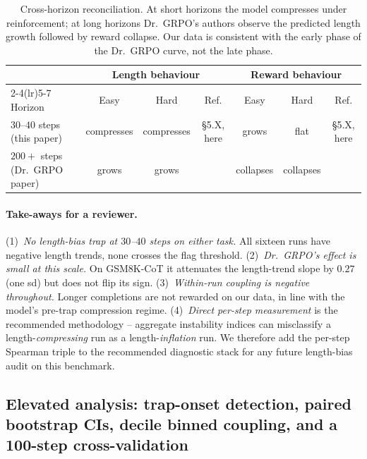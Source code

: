 \begin{table}[htbp]
\centering
\small
\begin{tabular}{lcccccc}
\toprule
& \multicolumn{3}{c}{Length behaviour} & \multicolumn{3}{c}{Reward behaviour} \\
\cmidrule(lr){2-4}\cmidrule(lr){5-7}
Horizon & Easy & Hard & Ref. & Easy & Hard & Ref. \\
\midrule
$30$--$40$ steps (this paper)         & compresses & compresses & §5.X, here & grows    & flat    & §5.X, here \\
$200{+}$ steps (Dr.~GRPO paper)        & grows      & grows      & \cite{tong2025drgrpo} & collapses & collapses & \cite{tong2025drgrpo} \\
\bottomrule
\end{tabular}
\caption{Cross-horizon reconciliation. At short horizons the model compresses under
reinforcement; at long horizons Dr.~GRPO's authors observe the predicted length growth
followed by reward collapse. Our data is consistent with the early phase of the
Dr.~GRPO curve, not the late phase.}
\label{tab:length-bias-horizon}
\end{table}

\paragraph{Take-aways for a reviewer.}
(1)~\emph{No length-bias trap at $30$--$40$ steps on either task.}
All sixteen runs have negative length trends, none crosses the
flag threshold. (2)~\emph{Dr.~GRPO's effect is small at this scale.}
On GSM8K-CoT it attenuates the length-trend slope by $0.27$ (one
sd) but does not flip its sign. (3)~\emph{Within-run coupling is
negative throughout.} Longer completions are not rewarded on our
data, in line with the model's pre-trap compression regime.
(4)~\emph{Direct per-step measurement} is the recommended
methodology -- aggregate instability indices can misclassify a
length-\emph{compressing} run as a length-\emph{inflation} run.
We therefore add the per-step Spearman triple to the recommended
diagnostic stack for any future length-bias audit on this benchmark.

\subsection{Elevated analysis: trap-onset detection, paired bootstrap CIs, decile binned coupling, and a 100-step cross-validation}
\label{sec:length-bias-elevated}

